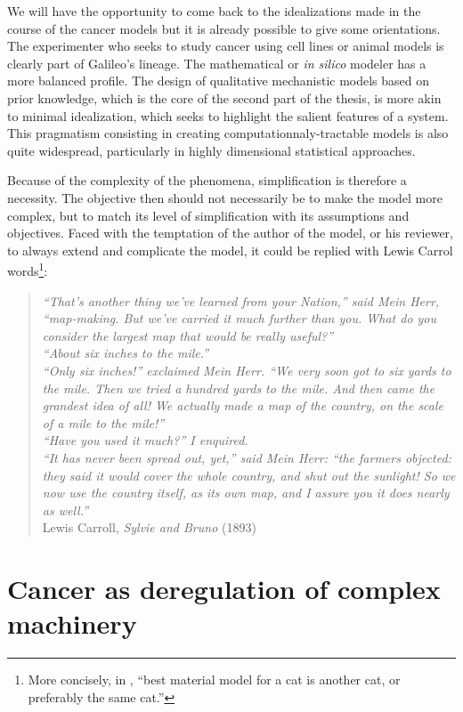 \documentclass[a4paper,12pt,twoside,onecolumn,openright,final,oldfontcommands]{memoir}
\begin{document}
We will have the opportunity to come back to the idealizations made in
the course of the cancer models but it is already possible to give some
orientations. The experimenter who seeks to study cancer using cell
lines or animal models is clearly part of Galileo's lineage. The
mathematical or \emph{in silico} modeler has a more balanced profile.
The design of qualitative mechanistic models based on prior knowledge,
which is the core of the second part of the thesis, is more akin to
minimal idealization, which seeks to highlight the salient features of a
system. This pragmatism consisting in creating computationnaly-tractable
models is also quite widespread, particularly in highly dimensional
statistical approaches.

Because of the complexity of the phenomena, simplification is therefore
a necessity. The objective then should not necessarily be to make the
model more complex, but to match its level of simplification with its
assumptions and objectives. Faced with the temptation of the author of
the model, or his reviewer, to always extend and complicate the model,
it could be replied with Lewis Carrol words\footnote{More concisely, in
  \citep{rosenblueth1945role}, ``best material model for a cat is
  another cat, or preferably the same cat.''}:

\begin{quote}
\emph{``That's another thing we've learned from your Nation,'' said Mein
Herr, ``map-making. But we've carried it much further than you. What do
you consider the largest map that would be really useful?''}\\
\emph{``About six inches to the mile.''}\\
\emph{``Only six inches!'' exclaimed Mein Herr. ``We very soon got to
six yards to the mile. Then we tried a hundred yards to the mile. And
then came the grandest idea of all! We actually made a map of the
country, on the scale of a mile to the mile!''}\\
\emph{``Have you used it much?'' I enquired.}\\
\emph{``It has never been spread out, yet,'' said Mein Herr: ``the
farmers objected: they said it would cover the whole country, and shut
out the sunlight! So we now use the country itself, as its own map, and
I assure you it does nearly as well.''}\\
Lewis Carroll, \emph{Sylvie and Bruno} (1893)
\end{quote}

\chapter{Cancer as deregulation of complex
machinery}\label{cancer-as-deregulation-of-complex-machinery}
\end{document}
